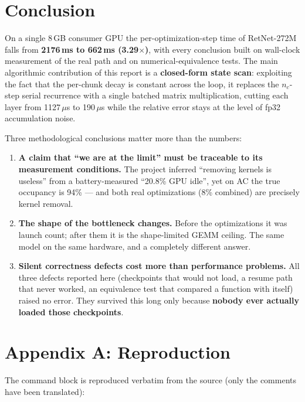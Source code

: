 \section{Conclusion}
\label{sec:en-concl}

On a single 8\,GB consumer GPU the per-optimization-step time of RetNet-272M falls from
\textbf{2176\,ms to 662\,ms (3.29$\times$)}, with every conclusion built on wall-clock
measurement of the real  path and on numerical-equivalence tests. The main
algorithmic contribution of this report is a \textbf{closed-form state scan}: exploiting the
fact that the per-chunk decay is constant across the loop, it replaces the $n_c$-step serial
recurrence with a single batched matrix multiplication, cutting each layer from 1127\,$\mu$s
to 190\,$\mu$s while the relative error stays at the level of fp32 accumulation noise.

Three methodological conclusions matter more than the numbers:

\begin{enumerate}
\item \textbf{A claim that ``we are at the limit'' must be traceable to its measurement
      conditions.} The project inferred ``removing kernels is useless'' from a
      battery-measured ``20.8\% GPU idle'', yet on AC the true occupancy is 94\% --- and both
      real optimizations (8\% combined) are precisely kernel removal.
\item \textbf{The shape of the bottleneck changes.} Before the optimizations it was launch
      count; after them it is the shape-limited GEMM ceiling. The same model on the same
      hardware, and a completely different answer.
\item \textbf{Silent correctness defects cost more than performance problems.} All three
      defects reported here (checkpoints that would not load, a resume path that never
      worked, an equivalence test that compared a function with itself) raised no error. They
      survived this long only because \textbf{nobody ever actually loaded those checkpoints}.
\end{enumerate}

\section{Appendix A: Reproduction}
\label{sec:en-appA}

The command block is reproduced verbatim from the source (only the \code{\#} comments have
been translated):

